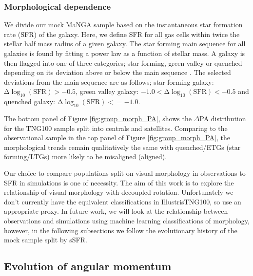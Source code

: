 \subsubsection{Morphological dependence} 
We divide our mock MaNGA sample based on the instantaneous star formation rate (SFR) of the galaxy. Here, we define SFR for all gas cells within twice the stellar half mass radius of a given galaxy. The star forming main sequence for all galaxies is found by fitting a power law as a function of stellar mass. A galaxy is then flagged into one of three categories; star forming, green valley or quenched depending on its deviation above or below the main sequence \citep{pillepich2019}. The selected deviations from the main sequence are as follows; star forming galaxy: $\mathrm{\Delta \log_{10}(SFR) > −0.5}$, green valley galaxy: $\mathrm{-1.0 < \Delta \log_{10}(SFR) < -0.5}$ and quenched galaxy: $\mathrm{\Delta \log_{10}(SFR) <= -1.0}$. 

The bottom panel of Figure \ref{fig:group_morph_PA}, shows the $\Delta$PA distribution for the TNG100 sample split into centrals and satellites. Comparing to the observational sample in the top panel of Figure \ref{fig:group_morph_PA}, the morphological trends remain qualitatively the same with quenched/ETGs (star forming/LTGs) more likely to be misaligned (aligned).

Our choice to compare populations split on visual morphology in observations to SFR in simulations is one of necessity. The aim of this work is to explore the relationship of visual morphology with decoupled rotation. Unfortunately we don't currently have the equivalent classifications in IllustrisTNG100, so use an appropriate proxy. In future work, we will look at the relationship between observations and simulations using machine learning classifications of morphology, however, in the following subsections we follow the evolutionary history of the mock sample split by sSFR.

\subsection{Evolution of angular momentum} \label{sec:tng_ang_mom_evo}
